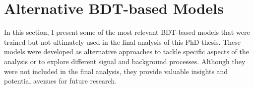 \begin{comment}
\begin{table}[]
\centering
\begin{tabular}{l|l|l|l|l}
\toprule
BDT$(\tHq)<$ 0.6 + & \multirow{2}{*}{\ttbar} 	& \multirow{2}{*}{Total} & \multirow{2}{*}{$\frac{\ttbar}{Total}$ (\%)} & \multirow{2}{*}{Significance} \\
\HT [GeV] cut           &                      			&                                  &                                				     &                               \\ \midrule
$ \HT \leq $245 & 6.9 & 19.1 & 36.13 & 1.823 \\
$ \HT \leq $250 & 7.4 & 20.8 & 35.58 & 1.869 \\
$ \HT \leq $255 & 7.9 & 22.5 & 35.11 & 1.914 \\
$ \HT \leq $260 & 8.1 & 24.0 & 33.75 & 1.888 \\
$ \HT \leq $265 & 8.3 & 25.6 & 32.42 & 1.861 \\
$ \HT \leq $270 & 8.8 & 27.6 & 31.88 & 1.896 \\
$ \HT \leq $275 & 9.1 & 29.5 & 30.85 & 1.887 \\
$ \HT \leq $280 & 9.3 & 31.0 & 30.00 & 1.875 \\
$ \HT \leq $285 & 9.6 & 32.8 & 29.27 & 1.875 \\ \bottomrule
\end{tabular}
\caption{Scanning purity of the \ttbar process depending requirement on the maximum \HT allowed 
in the region of the phase space orthogonal to \dilepSStau SR.
This is used to define the CR(\ttbar).}
\label{tab:tHq:EventSelection:CR:SS:HTScan_ttbar}
\end{table}

\end{comment}



\FloatBarrier
\section{Alternative BDT-based Models}
\label{sec:BDT:AltModels}
In this section, I present some of the most relevant BDT-based models that were trained but not ultimately used in the final analysis of this PhD thesis. These models were developed as alternative approaches to tackle specific aspects of the analysis or to explore different signal and background processes. Although they were not included in the final analysis, they provide valuable insights and potential avenues for future research.

